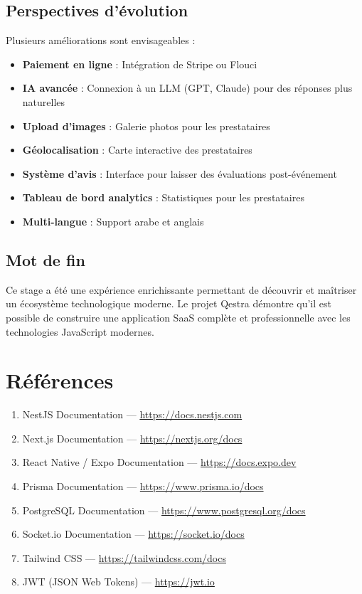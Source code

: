 \documentclass[12pt,a4paper]{report}
\begin{document}
\section{Perspectives d'évolution}
Plusieurs améliorations sont envisageables :
\begin{itemize}
  \item \textbf{Paiement en ligne} : Intégration de Stripe ou Flouci
  \item \textbf{IA avancée} : Connexion à un LLM (GPT, Claude) pour des réponses plus naturelles
  \item \textbf{Upload d'images} : Galerie photos pour les prestataires
  \item \textbf{Géolocalisation} : Carte interactive des prestataires
  \item \textbf{Système d'avis} : Interface pour laisser des évaluations post-événement
  \item \textbf{Tableau de bord analytics} : Statistiques pour les prestataires
  \item \textbf{Multi-langue} : Support arabe et anglais
\end{itemize}

\section{Mot de fin}
Ce stage a été une expérience enrichissante permettant de découvrir et maîtriser un écosystème technologique moderne. Le projet Qestra démontre qu'il est possible de construire une application SaaS complète et professionnelle avec les technologies JavaScript modernes.

\chapter*{Références}

\begin{enumerate}
  \item NestJS Documentation — \url{https://docs.nestjs.com}
  \item Next.js Documentation — \url{https://nextjs.org/docs}
  \item React Native / Expo Documentation — \url{https://docs.expo.dev}
  \item Prisma Documentation — \url{https://www.prisma.io/docs}
  \item PostgreSQL Documentation — \url{https://www.postgresql.org/docs}
  \item Socket.io Documentation — \url{https://socket.io/docs}
  \item Tailwind CSS — \url{https://tailwindcss.com/docs}
  \item JWT (JSON Web Tokens) — \url{https://jwt.io}
\end{enumerate}
\end{document}
